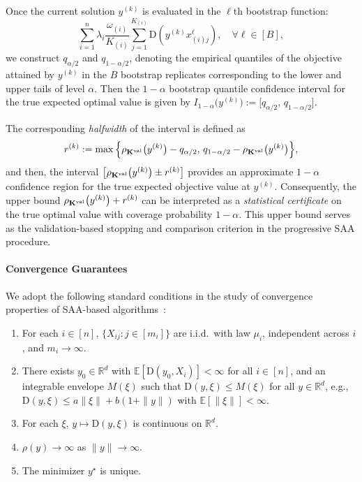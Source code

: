\documentclass[letter,11pt, reqno]{amsart}
\newcommand{\R}{\mathbb{R}}
\newcommand{\E}{\mathbb{E}}
\newcommand{\D}{\mathrm{D}}
\renewcommand{\;}{\quad}
\theoremstyle{thmstyleone}%
\theoremstyle{thmstyletwo}%
\theoremstyle{thmstylethree}%
\begin{document}
Once the current solution $y^{(k)}$ is evaluated in the $\ell$th bootstrap function:
    \begin{equation*}
        \sum_{i=1}^n \lambda_i \frac{\omega_{(i)}}{K_{(i)}}\sum_{j =1}^{K_{(i)}} \mathrm{D}(y^{(k)}x_{(i)j}^{\ell}), \; \forall \ell\in [B],
    \end{equation*}
we construct $q_{\alpha/2}$ and $q_{1-\alpha/2}$, denoting the empirical quantiles of the objective attained by $y^{(k)}$ in the  $B$ bootstrap replicates corresponding to the lower and upper tails of level $\alpha$.
Then the $1-\alpha$ bootstrap quantile confidence interval for the true expected optimal value
is given by $
I_{1-\alpha}\bigl(y^{(k)}\bigr)
:=
\bigl[
    q_{\alpha/2},\,
    q_{1-\alpha/2}
\bigr]$.

The corresponding \emph{halfwidth} of the interval is defined as 
\begin{equation*}
    r^{(k)} := \max\Big\{\rho_{\mathbf{K}^{\rm val}}\bigl(y^{(k)}\bigr) - q_{\alpha/2},\, q_{1-\alpha/2} - \rho_{\mathbf{K}^{\rm val}}\bigl(y^{(k)}\bigr) \Big\},
\end{equation*}
and then, the interval 
$\bigl[\rho_{\mathbf{K}^{\rm val}}\bigl(y^{(k)}\bigr)\pm r^{(k)}\bigr]$
provides an approximate $1-\alpha$ confidence region for the
true expected objective value at $y^{(k)}$.
Consequently, the upper bound $\rho_{\mathbf{K}^{\rm val}}\bigl(y^{(k)}\bigr)+ r^{(k)}$ can be interpreted as a \emph{statistical certificate} on the true optimal value with coverage probability $1-\alpha$.
This upper bound serves as the validation-based stopping and comparison criterion in the progressive SAA procedure.


\paragraph{\bf Convergence Guarantees}

We adopt the following standard conditions in the study of convergence properties of SAA-based algorithms~\citep[see, e.g.,][]{ShapiroDentchevaRuszczynski2014}:%
\begin{enumerate}[label={\rm (A\arabic*)}]
\item For each $i\in [n]$, $\{X_{ij}: j\in[m_i]\}$ are i.i.d.\ with law $\mu_i$, independent across $i$, and $m_i\to\infty$. \label{a1}
\item There exists $y_0\in\R^d$ with $\E\left[\D(y_0,X_i)\right]<\infty$ for all $i\in [n]$, and an integrable envelope $M(\xi)$ such that $\D(y,\xi) \le M(\xi)$ for all $y\in\R^d$,  e.g., $\D(y,\xi)\le a\|\xi\|+b(1+\|y\|)$ with $\E\left[\|\xi\|\right]<\infty$.\label{a2}
\item For each $\xi$, $y\mapsto \D(y,\xi)$ is continuous on $\R^d$.\label{a3}
\item $\rho(y)\to\infty$ as $\|y\|\to\infty$.\label{a4}
\item The minimizer $y^\star$ is unique.\label{a5}
\end{enumerate}
\end{document}
